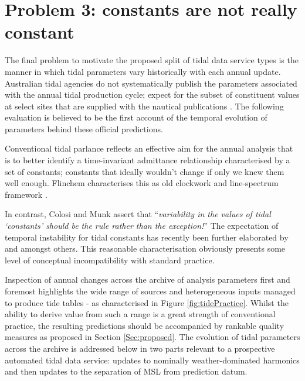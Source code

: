 \section{Problem 3: constants are not really constant}
\label{Sec:Evolution}
The final problem to motivate the proposed split of tidal data service types is the manner in which tidal parameters vary historically with each annual update.
Australian tidal agencies do not systematically publish the parameters associated with the annual tidal production cycle; expect for the subset of constituent values at select sites that are supplied with the nautical publications \citep{austides}.  The following evaluation is believed to be the first account of the temporal evolution of parameters behind these official predictions.  

Conventional tidal parlance reflects an effective aim for the annual analysis that is to better identify a time-invariant admittance relationship characterised by a set of constants; constants that ideally wouldn't change if only we knew them well enough. Flinchem characterises this as old clockwork and  line-spectrum framework \citep{Flinchem:2000kp}. 

In contrast, Colosi and Munk assert that ``\textit{variability in the values of tidal `constants' should be the rule rather than the exception!}'' \citep{Colosi:2006va}
The expectation of temporal instability for tidal constants has recently been further elaborated by  \citeauthor{10.1029/2018rg000636} and \citeauthor{10.1002/2017jc013165} amongst others.    This reasonable characterisation obviously presents some level of conceptual incompatibility with standard practice.

Inspection of annual changes across the archive of analysis parameters first and foremost highlights the wide range of sources and heterogeneous inputs managed to produce tide tables - as characterised in Figure \ref{fig:tidePractice}.    Whilst the ability to derive value from such a range is a great strength of conventional practice, the resulting predictions  should be accompanied by rankable quality measures as proposed in Section \ref{Sec:proposed}.
The evolution of tidal parameters across the archive is addressed below in two parts relevant to a prospective automated tidal data service:  updates to nominally weather-dominated harmonics and then updates to the separation of MSL from prediction datum.

